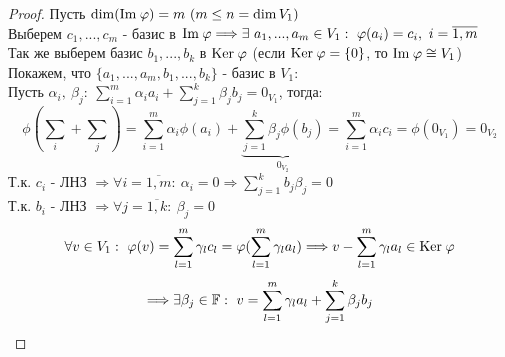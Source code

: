     \begin{proof}
        Пусть $\dim (\text{Im} \hspace{0.09cm} \phi) = m \ (m \leq n = \dim V_1 )$\\
        Выберем $c_1,...,c_m$ - базис в $\text{Im} \hspace{0.09cm} \phi \Longrightarrow \exists \ a_1,...,a_m \in V_1: \ \phi(a_i) = c_i, \ i = \overline{1,m}$\\
        Так же выберем базис $b_1,...,b_k$ в $\text{Ker} \hspace{0.09cm} \phi$ (если $\text{Ker} \hspace{0.09cm} \phi = \{0\}$, то $\text{Im} \hspace{0.09cm} \phi \cong V_1$)\\
        Покажем, что $\{a_1,...,a_m, b_1,...,b_k\}$  - базис в $V_1$:\\
        Пусть $\alpha_i, \ \beta_j : \ \sum \limits_{i=1}^m \alpha_i a_i + \sum \limits_{j=1}^k \beta_j b_j = 0_{V_1}$, тогда:
        $$\phi(\sum \limits_{i} + \sum \limits_{j}) = \sum \limits_{i=1}^m \alpha_i \phi(a_i) + \underbrace{\sum \limits_{j=1}^k \beta_j \phi(b_j)}_{0_{V_2}}  = \sum \limits_{i=1}^m \alpha_i c_i = \phi(0_{V_1}) = 0_{V_2}$$
        Т.к. $c_i$ - ЛНЗ $\Longrightarrow \forall i = \overline{1,m}: \ \alpha_i = 0 \Longrightarrow \sum \limits_{j=1}^k b_j \beta_j = 0$\\
        Т.к. $b_i$ - ЛНЗ $\Longrightarrow \forall j= \overline{1,k}: \ \beta_j = 0$ 
        $$\forall v\in V_1: \ \phi(v) = \sum \limits_{l=1}^m \gamma_l c_l = \phi(\sum \limits_{l=1}^m \gamma_l a_l) \Longrightarrow v - \sum \limits_{l=1}^m \gamma_l a_l \in \text{Ker} \hspace{0.09cm} \phi$$
        $$\Longrightarrow \exists \beta_j \in \F : \ v = \sum \limits_{l=1}^m \gamma_l a_l + \sum \limits_{j=1}^k \beta_j b_j$$    
    \end{proof}